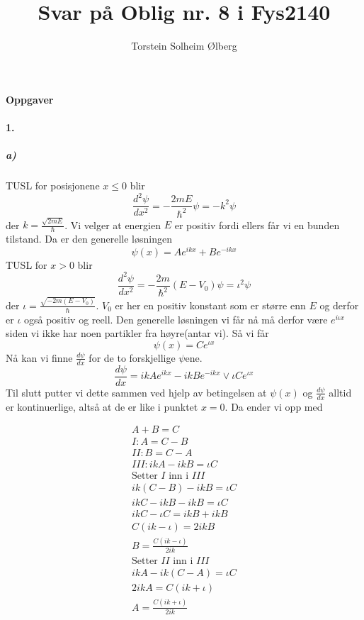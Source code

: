 \documentclass[11pt, A4paper,norsk]{article}
\author{Torstein Solheim Ølberg}
\title{Svar på Oblig nr. 8 i Fys2140}
\begin{document}
\maketitle
	\begin{center}
\Large \textbf{Oppgaver}
	\end{center}









		\paragraph{1.}
			\subparagraph{a)}
				\begin{flushleft}
TUSL for posisjonene $x \leq 0$ blir
$$\frac{d^2 \psi}{dx^2} = - \frac{2 m E}{\hbar^2} \psi = - k^2 \psi$$
der $k = \frac{\sqrt{2 m E}}{\hbar}$. Vi velger at energien $E$ er positiv fordi ellers får vi en bunden tilstand. Da er den generelle løsningen
$$\psi(x) = A e^{i k x} + B e^{- i k x}$$
TUSL for $x > 0$ blir
$$\frac{d^2 \psi}{dx^2} = - \frac{2 m}{\hbar^2} (E - V_0) \psi = \iota^2 \psi$$
der $\iota = \frac{\sqrt{- 2 m (E - V_0)}}{\hbar}$. $V_0$ er her en positiv konstant som er større enn $E$ og derfor er $\iota$ også positiv og reell. Den generelle løsningen vi får nå må derfor være $e^{i\iota x}$ siden vi ikke har noen partikler fra høyre(antar vi). Så vi får
$$\psi(x) = C e^{\iota x}$$
Nå kan vi finne $\frac{d \psi}{dx}$ for de to forskjellige $\psi$ene.
$$\frac{d \psi}{dx} = ikAe^{ikx} - ikBe^{-ikx} \vee \iota Ce^{\iota x}$$
Til slutt putter vi dette sammen ved hjelp av betingelsen at $\psi(x)$ og $\frac{d \psi}{dx}$ alltid er kontinuerlige, altså at de er like i punktet $x = 0$. Da ender vi opp med
				\end{flushleft}
				\begin{gather*}
A + B = C \\
I : A = C - B \\
II : B = C - A \\
III : ikA - ikB = \iota C \\
\text{Setter $I$ inn i $III$} \\
ik(C - B) - ikB = \iota C \\
ikC - ikB - ikB = \iota C \\
ikC - \iota C = ikB + ikB \\
C (ik - \iota) = 2 i k B \\
B = \frac{C (ik - \iota)}{2 i k} \\
\text{Setter $II$ inn i $III$} \\
ikA - ik(C - A) = \iota C \\
2 i k A = C (ik + \iota) \\
A = \frac{C (ik + \iota)}{2 i k}
				\end{gather*}
\end{document}
